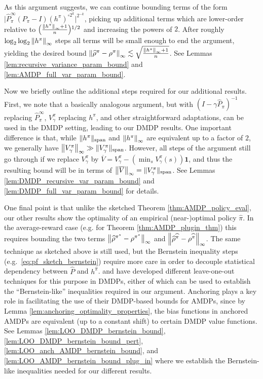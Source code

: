 \documentclass{article}
\theoremstyle{plain}
\theoremstyle{plain}
\theoremstyle{remark}
\theoremstyle{plain}
\theoremstyle{plain}
\newcommand{\Phat}{\widehat{P}}
\newcommand{\pistar}{\pi^\star}
\newcommand{\one}{\mathbf{1}}
\newcommand{\pihat}{\widehat{\pi}}
\newcommand{\rhohat}{\widehat{\rho}}
\newcommand\cig[1]{\scalerel*[5.5pt]{\Big#1}{%
  \ensurestackMath{\addstackgap[1.5pt]{\big#1}}}}
\begin{document}
As this argument suggests, we can continue bounding terms of the form $\big| \Phat^\infty_\pi (P_\pi - I) (h^\pi)^{\circ 2^k} \big|^{2^{-k}}$, picking up additional terms which are lower-order relative to $\cig(\frac{\infnorm{h^\pi}+1}{n}\cig)^{1/2}$ and increasing the powers of $2$. After roughly $\log_2 \log_2 \left\Vert h^\pi\right\Vert _{\infty}$ steps all terms will be small enough to end the argument, yielding the desired bound $\infnorm{\rhohat^\pi - \rho^\pi} \lesssim \sqrt{\frac{\infnorm{h^\pi}+1}{n}}$. See Lemmas \ref{lem:recursive_variance_param_bound} and \ref{lem:AMDP_full_var_param_bound}.

Now we briefly outline the additional steps required for our additional results. First, we note that a basically analogous argument, but with $(I - \gamma \Phat_\pi)^{-1}$ replacing $\Phat_\pi^\infty$, $V_\gamma^\pi$ replacing $h^\pi$, and other straightforward adaptations, can be used in the DMDP setting, leading to our DMDP results. One important difference is that, while $\Vert h^\pi\Vert _{\textnormal{span}}$ and $\left\Vert h^\pi\right\Vert _{\infty}$ are equivalent up to a factor of $2$, we generally have $\left\Vert V_\gamma^\pi\right\Vert _{\infty} \gg \Vert V_\gamma^\pi\Vert _{\textnormal{span}}$. However, all steps of the argument still go through if we replace $V_\gamma^\pi$ by $\overline{V} = V_\gamma^\pi - (\min_s V_\gamma^\pi(s))\one$, and thus the resulting bound will be in terms of $\left\Vert \overline{V}\right\Vert _{\infty} = \Vert V_\gamma^\pi\Vert _{\textnormal{span}}$. See Lemmas \ref{lem:DMDP_recursive_var_param_bound} and \ref{lem:DMDP_full_var_param_bound} for details.

One final point is that unlike the sketched Theorem \ref{thm:AMDP_policy_eval}, our other results show the optimality of an empirical (near-)optimal policy $\pihat$. In the average-reward case (e.g. for Theorem \ref{thm:AMDP_plugin_thm}) this requires bounding the two terms $\infnorm{\rhohat^{\pistar} - \rho^{\pistar}}$ and $\infnorm{\rhohat^{\pihat} - \rho^{\pihat}}$. The same technique as sketched above is still used, but the Bernstein inequality steps (e.g.~\eqref{eq:pf_sketch_bernstein}) require more care in order to decouple statistical dependency between $\Phat$ and $h^{\pihat}$. \cite{agarwal_model-based_2020} and \cite{li_breaking_2020} have developed different leave-one-out techniques for this purpose in DMDPs, either of which can be used to establish the ``Bernstein-like'' inequalities required in our argument. Anchoring plays a key role in facilitating the use of their DMDP-based bounds for AMDPs, since by Lemma \ref{lem:anchoring_optimality_properties}, the bias functions in anchored AMDPs are equivalent (up to a constant shift) to certain DMDP value functions. See Lemmas \ref{lem:LOO_DMDP_bernstein_bound}, \ref{lem:LOO_DMDP_bernstein_bound_pert}, \ref{lem:LOO_anch_AMDP_bernstein_bound}, and \ref{lem:LOO_AMDP_bernstein_bound_plug_in} where we establish the Bernstein-like inequalities needed for our different results.
\end{document}
